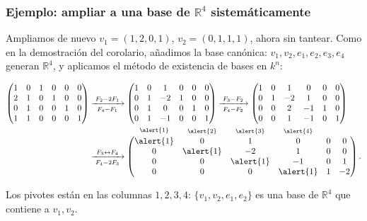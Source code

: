 \begin{frame}
    \frametitle{Ejemplo: ampliar a una base de \(\mathbb{R}^4\) sistemáticamente}

    \begin{example}

        \vspace{-5pt}

        Ampliamos de nuevo \(v_1=(1,2,0,1)\), \(v_2=(0,1,1,1)\), ahora sin
        tantear. Como en la demostración del corolario, añadimos la base
        canónica: \(v_1,v_2,e_1,e_2,e_3,e_4\) generan \(\mathbb{R}^4\), y
        aplicamos el método de existencia de bases en \(k^n\):

        \vspace{-15pt}

        \begin{align*}
            \begin{pmatrix}
                1&0&1&0&0&0\\
                2&1&0&1&0&0\\
                0&1&0&0&1&0\\
                1&1&0&0&0&1
            \end{pmatrix}
            &\xrightarrow[\;F_4-F_1\;]{\;F_2-2F_1\;}
            \begin{pmatrix}
                1&0&1&0&0&0\\
                0&1&-2&1&0&0\\
                0&1&0&0&1&0\\
                0&1&-1&0&0&1
            \end{pmatrix}
            \xrightarrow[\;F_4-F_2\;]{\;F_3-F_2\;}
            \begin{pmatrix}
                1&0&1&0&0&0\\
                0&1&-2&1&0&0\\
                0&0&2&-1&1&0\\
                0&0&1&-1&0&1
            \end{pmatrix}\\[2.5ex]
            &\xrightarrow[\;F_4-2F_3\;]{\;F_3\leftrightarrow F_4\;}
            \begin{pmatrix}
                \smash{\overset{\raisebox{1ex}{$\scriptstyle\alert{1}$}}{\alert{1}}}&\smash{\overset{\raisebox{1ex}{$\scriptstyle\alert{2}$}}{0}}&\smash{\overset{\raisebox{1ex}{$\scriptstyle\alert{3}$}}{1}}&\smash{\overset{\raisebox{1ex}{$\scriptstyle\alert{4}$}}{0}}&0&0\\
                0&\alert{1}&-2&1&0&0\\
                0&0&\alert{1}&-1&0&1\\
                0&0&0&\alert{1}&1&-2
            \end{pmatrix}.
        \end{align*}

        \vspace{-8pt}

        Los pivotes están en las columnas \(1,2,3,4\): \(\{v_1,v_2,e_1,e_2\}\)
        es una base de \(\mathbb{R}^4\) que contiene a \(v_1,v_2\).
    \end{example}
\end{frame}
